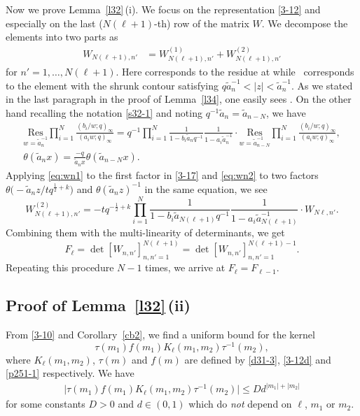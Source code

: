 \documentclass[pdftex]{sigma}
\numberwithin{equation}{section}
\def\i{\infty}
\def\t{\tau}
\begin{document}
 Now we prove Lemma~\ref{l32}\,(i). We focus on the representation \eqref{3-12} and especially on the last ($N(\ell+1)$-th) row of the matrix $W$. We decompose the elements into two parts as
\begin{align*}%
 W_{N(\ell+1),n'}
 &=W^{(1)}_{N(\ell+1),n'}+W^{(2)}_{N(\ell +1),n'}
\end{align*}
 for $n'\!=\!1,\dots,N(\ell+1)$. Here
  corresponds to
 the residue at 
 while~ corresponds to the element with the shrunk contour
 satisfying
 $q\tilde{a}_{n}^{-1}<|z|<\tilde{a}_{n}^{-1}$.
 As we stated in the last paragraph in the proof of Lemma~\ref{l34}, one easily sees .
 On the other hand recalling the notation \eqref{s32-1} and noting $q^{-1}\tilde{a}_n=\tilde{a}_{n-N}$, we have
 \begin{gather}
\underset{w=\tilde{a}_{n}^{-1}}{\text{Res}}
 \prod_{i=1}^N\frac{(b_i/w;q)_{\i}}{(a_i w;q)_{\i}}
 = q^{-1}
 \prod_{i=1}^N\frac{1}{1-b_i\tilde{a}_nq^{-1}}\frac{1}{1-a_i\tilde{a}_n^{-1}}
 \cdot
 \underset{w=\tilde{a}_{n-N}^{-1}}{\text{Res}}
 \prod_{i=1}^N\frac{(b_i/w;q)_{\i}}{(a_i w;q)_{\i}}, \label{eq:wn1}
 \\
 \theta(\tilde{a}_n x)=\frac{-q}{\tilde{a}_n x}
 \theta(\tilde{a}_{n-N}x).\label{eq:wn2}
 \end{gather}
 Applying \eqref{eq:wn1} to the first factor in \eqref{3-17} and \eqref{eq:wn2} to two factors $\theta\bigl(-\tilde{a}_n z/tq^{\frac12+k}\bigr)$ and $\theta(\tilde{a}_nz)^{-1}$ in the same equation, we see
 \[%
 W^{(2)}_{N(\ell+1),n'}=-tq^{-\frac12+k}\prod_{i=1}^N\frac{1}{1-b_i\tilde{a}_{N(\ell+1)}q^{-1}}\frac{1}{1-a_i\tilde{a}_{N(\ell+1)}^{-1}}\cdot W_{N\ell,n'}.
 \]
 Combining them
 with the multi-linearity of determinants,
 we get
\[
 F_{\ell}=\det[W_{n,n'}]_{n,n'=1}^{N(\ell +1)}
 =
 \det[W_{n,n'}]_{n,n'=1}^{N(\ell+1)-1}.
\]
 Repeating this procedure $N-1$ times, we arrive at $F_{\ell}=F_{\ell-1}$.


\subsection[Proof of Lemma 3.4 (ii)]{Proof of Lemma~\ref{l32}\,(ii)}
\label{s33}
 From \eqref{3-10}
 and Corollary~\ref{cb2}, we find a uniform bound for the kernel
 \[
 \t(m_1)f(m_1)K_{\ell}(m_1,m_2)\t^{-1}(m_2),
 \]
 where
 $K_{\ell}(m_1,m_2)$, $\t(m)$ and $f(m)$ are defined by \eqref{d31-3}, \eqref{3-12d} and \eqref{p251-1} respectively. We have
 \begin{align}
 \label{3-32}
 \big|\t(m_1)f(m_1)K_{\ell}(m_1,m_2)\t^{-1}(m_2) \big|\le Dd^{|m_1|+|m_2|}
 \end{align}
 for some constants $D>0$ and $d\in (0,1)$ which do {\it not} depend on $\ell$, $m_1$ or $m_2$.
\end{document}
